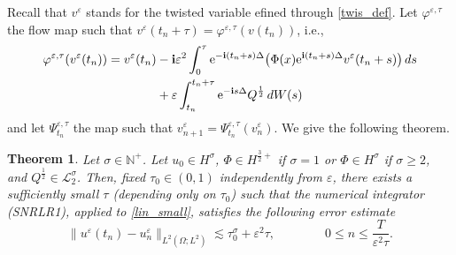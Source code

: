 \documentclass[a4paper]{amsart}
\newtheorem{theorem}{Theorem}[section]
\begin{document}
Recall that $v^\varepsilon$ stands for the twisted variable efined through \eqref{twis_def}. Let $\varphi^{\varepsilon,\tau}$ the flow map such that $v^\varepsilon(t_n+\tau)=\varphi^{\varepsilon,\tau}(v(t_n))$, i.e., 
\begin{align}
\varphi^{\varepsilon,\tau} (v^\varepsilon(t_n))=v^\varepsilon(t_n)&-{\bf i}\varepsilon^2\int_{0}^{\tau} {\rm e}^{-{\bf i}(t_n+s)\Delta} \big(\Phi(x){\rm e}^{{\bf i}(t_n+s)\Delta} v^\varepsilon(t_n+s)\big)\,ds\notag \\
&+\varepsilon \int_{t_n}^{t_n+\tau}{\rm e}^{-{\bf i}s \Delta} Q^{\frac{1}{2}}\,dW(s)     \label{twis_sol_lin_small]}
\end{align}
and let $\Psi_{t_n}^{\varepsilon,\tau}$ the map such that $v^\varepsilon_{n+1}=\Psi_{t_n}^{\varepsilon,\tau}(v^\varepsilon_n)$. 
We give the following theorem.
\begin{theorem}
\label{lobg_term_res1}
Let $\sigma\in\mathbb{N}^+$. Let $u_0\in H^\sigma$, $\Phi\in H^{\frac{3}{2}+}$ if $\sigma=1$ or $\Phi\in H^\sigma$ if $\sigma\ge 2$, and $Q^{\frac{1}{2}}\in\mathcal{L}_2^\sigma$. Then, fixed $\tau_0\in (0,1)$ independently from $\varepsilon$, there exists a sufficiently small $\tau$ (depending only on $\tau_0$) such that the numerical integrator (SNRLR1), applied to \eqref{lin_small}, satisfies the following error estimate 
\begin{equation}
    \label{re1}
\|u^\varepsilon(t_n)-u^\varepsilon_n\|_{L^2(\Omega; L^2)}\lesssim \tau_0^\sigma+\varepsilon^2 \tau, \qquad \qquad 0\le n \le \frac{T}{\varepsilon^2 \tau}.
\end{equation}
\end{theorem}
\end{document}
